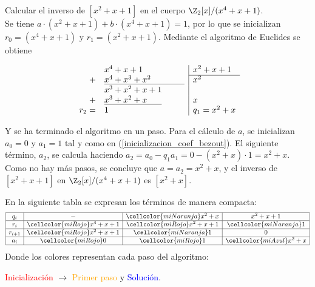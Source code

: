 \begin{ejs}\renewcommand{\arraystretch}{1.2}\label{Ejemplo:inversoEuclides}

    \item Calcular el inverso de $[x^2 + x + 1]$ en el cuerpo $\Z_2[x]/(x^4 + x + 1)$.\\[1ex]
    Se tiene $a\cdot(x^2 + x + 1) + b\cdot (x^4 + x + 1) = 1$, por lo que se inicializan $r_0 = (x^4 + x + 1)$ y $r_1 = (x^2 + x + 1)$. Mediante el algoritmo de Euclides se obtiene
        \begin{center}
            \[
            \begin{array}{rl|l}
                &x^4 + x + 1 & x^2 + x + 1 \\\cline{3-3} 
                +&\underline{x^4 + x^3 + x^2 \phantom{{}+x^2 + 1}} & x^2\\
                &x^3 + x^2 + x + 1 &  \\
                +&\underline{x^3 + x^2 + x\phantom{{ }+ 1}} & x\\
                r_2 =& 1 &  q_1 = x^2 + x 
            \end{array}
            \]
        \end{center}
        Y se ha terminado el algoritmo en un paso. Para el cálculo de $a$, se inicializan $a_0 = 0$ y $a_1 = 1$ tal y como en (\ref{inicializacion_coef_bezout}). El siguiente término, $a_2$, se calcula haciendo $a_2 = a_0 - q_1a_1 = 0 - (x^2 + x)\cdot 1 = x^2 + x$. Como no hay más pasos, se concluye que $a = a_2 = x^2 + x$, y el inverso de $[x^2 + x + 1]$ en $\Z_2[x]/(x^4 + x + 1)$ es $[x^2 + x]$.
        
        En la siguiente tabla se expresan los términos de manera compacta:
        \[
            \begin{array}{|c|c|c|c|}
                \hline
                q_i     &  -          & \cellcolor{miNaranja}x^2 + x     & x^2 + x + 1 \\
                \hline
                r_i    &  \cellcolor{miRojo}x^4 + x + 1 & \cellcolor{miRojo}x^2 + x + 1 & \cellcolor{miNaranja}1  \\
                \hline
                r_{i+1} &  \cellcolor{miRojo}x^2 + x + 1 & \cellcolor{miNaranja}1           &  0        \\
                \hline
                a_i     &\cellcolor{miRojo}0            &  \cellcolor{miRojo}1          &  \cellcolor{miAzul}x^2 + x       \\
                \hline
            \end{array}
        \]
         Donde los colores representan cada paso del algoritmo:%
        \begin{center}
        \vspace{-0.5em}
            \textcolor{red}{Inicialización} $\to$ \textcolor{orange}{Primer paso} y \textcolor{blue}{Solución}.
        \end{center} %
        \vspace{-0.5em}
    

\end{ejs}
